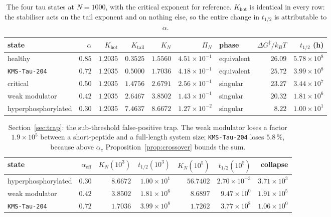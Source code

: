 \documentclass[11pt,reqno]{amsart}
\theoremstyle{plain}
\theoremstyle{definition}
\theoremstyle{remark}
\numberwithin{equation}{section}
\newcommand{\Kt}{K_{\mathrm{tail}}}
\newcommand{\Khot}{K_{\mathrm{hot}}}
\newcommand{\ac}{\alpha_c}
\newcommand{\aeff}{\alpha_{\mathrm{eff}}}
\newcommand{\kT}{k_{B}T}
\newcommand{\lead}{\texttt{KMS-Tau-204}}
\begin{document}
\begin{table}[ht]
\centering\footnotesize\setlength{\tabcolsep}{4.5pt}
\caption{The four tau states at $N=1000$, with the critical exponent for reference. $\Khot$ is identical in every row: the stabiliser acts on the tail exponent and on nothing else, so the entire change in $t_{1/2}$ is attributable to $\alpha$.}
\label{tab:states}
\begin{tabular}{@{}l r r r r r l r r@{}}
\toprule
state & $\alpha$ & $\Khot$ & $\Kt$ & $K_N$ & $\Pi_N$ & phase & $\Delta G^{\ddagger}/\kT$ & $t_{1/2}$ (h)\\
\midrule
healthy & $0.85$ & $1.2035$ & $0.3525$ & $1.5560$ & $4.51 \times 10^{-1}$ & equivalent & $26.09$ & $5.78 \times 10^{8}$\\
\lead{} & $0.72$ & $1.2035$ & $0.5000$ & $1.7036$ & $4.18 \times 10^{-1}$ & equivalent & $25.72$ & $3.99 \times 10^{8}$\\
critical & $0.50$ & $1.2035$ & $1.4756$ & $2.6791$ & $2.56 \times 10^{-1}$ & singular & $23.27$ & $3.44 \times 10^{7}$\\
weak modulator & $0.42$ & $1.2035$ & $2.6467$ & $3.8502$ & $1.43 \times 10^{-1}$ & singular & $20.32$ & $1.81 \times 10^{6}$\\
hyperphosphorylated & $0.30$ & $1.2035$ & $7.4637$ & $8.6672$ & $1.27 \times 10^{-2}$ & singular & $8.22$ & $1.00 \times 10^{1}$\\
\bottomrule
\end{tabular}
\end{table}

\begin{table}[ht]
\centering\small\setlength{\tabcolsep}{6pt}
\caption{Section~\ref{sec:trap}: the sub-threshold false-positive trap. The weak modulator loses a factor $1.9\times10^{5}$ between a short-peptide and a full-length system size; \lead{} loses $5.8\,\%$, because above $\ac$ Proposition~\ref{prop:crossover} bounds the sum.}
\label{tab:trap}
\begin{tabular}{@{}l r r r r r r@{}}
\toprule
state & $\aeff$ & $K_N(10^3)$ & $t_{1/2}(10^3)$ & $K_N(10^5)$ & $t_{1/2}(10^5)$ & collapse\\
\midrule
hyperphosphorylated & $0.30$ & $8.6672$ & $1.00 \times 10^{1}$ & $56.7402$ & $2.70 \times 10^{-3}$ & $3.71 \times 10^{3}$\\
weak modulator & $0.42$ & $3.8502$ & $1.81 \times 10^{6}$ & $8.6897$ & $9.47 \times 10^{0}$ & $1.91 \times 10^{5}$\\
\lead{} & $0.72$ & $1.7036$ & $3.99 \times 10^{8}$ & $1.7262$ & $3.77 \times 10^{8}$ & $1.06 \times 10^{0}$\\
\bottomrule
\end{tabular}
\end{table}
\end{document}
